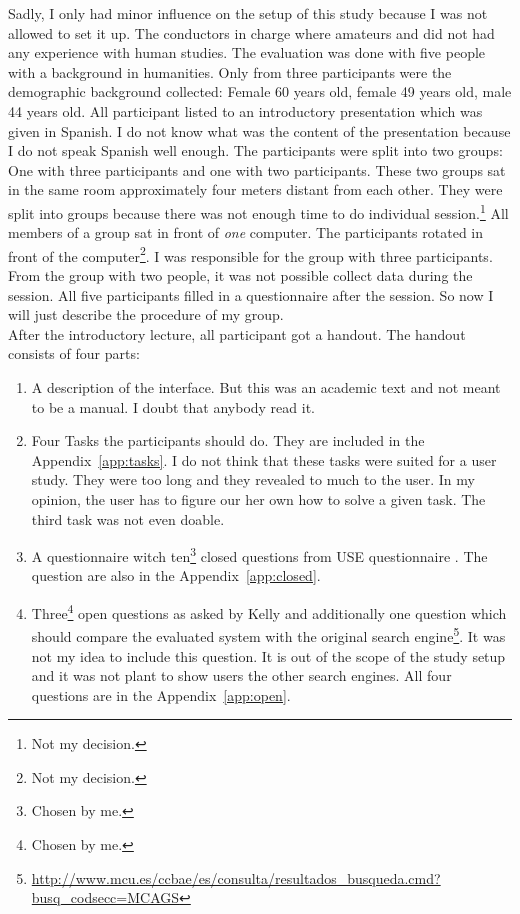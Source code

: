 \documentclass[11pt]{report}
\begin{document}
Sadly, I only had minor influence on the setup of this study because I was not allowed to set it up. The conductors in charge where amateurs and did not had any experience with human studies. The evaluation was done with five people with a background in humanities. Only from three participants were the demographic background collected: Female 60 years old, female 49 years old, male 44 years old. All participant listed to an introductory presentation which was given in Spanish. I do not know what was the content of the presentation because I do not speak Spanish well enough. The participants were split into two groups: One with three participants and one with two participants. These two groups sat in the same room approximately four meters distant from each other. They were split into groups because there was not enough time to do individual session.\footnote{Not my decision.} All members of a group sat in front of \textit{one} computer. The participants rotated in front of the computer\footnote{Not my decision.}. I was responsible for the group with three participants. From the group with two people, it was not possible collect data during the session. All five participants filled in a questionnaire after the session. So now I will just describe the procedure of my group. \\

	After the introductory lecture, all participant got a handout. The handout consists of four parts:
\begin{enumerate}
	\item A description of the interface. But this was an academic text and not meant to be a manual. I doubt that anybody read it.
	\item Four Tasks the participants should do. They are included in the Appendix~\ref{app:tasks}. I do not think that these tasks were suited for a user study. They were too long and they revealed to much to the user. In my opinion, the user has to figure our her own how to solve a given task. The third task was not even doable.
	\item A questionnaire witch ten\footnote{Chosen by me.} closed questions from USE questionnaire \cite{lund2001measuring}. The question are also in the Appendix~\ref{app:closed}.
	\item Three\footnote{Chosen by me.} open questions as asked by Kelly \cite{Kelly2008} and additionally one question which should compare the evaluated system with the original search engine\footnote{\url{http://www.mcu.es/ccbae/es/consulta/resultados_busqueda.cmd?busq_codsecc=MCAGS}}. It was not my idea to include this question. It is out of the scope of the study setup and it was not plant to show users the other search engines. All four questions are in the Appendix~\ref{app:open}.
\end{enumerate}
\end{document}
